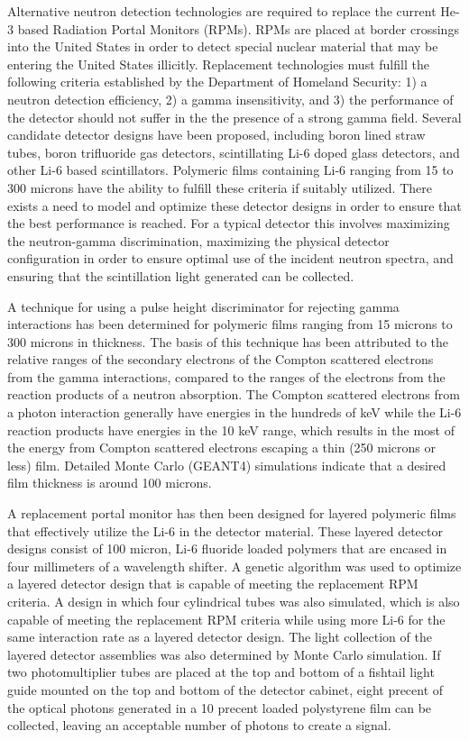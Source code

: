 Alternative neutron detection technologies are required to replace the current He-3 based Radiation Portal Monitors (RPMs).
RPMs are placed at border crossings into the United States in order to detect special nuclear material that may be entering the United States illicitly.
Replacement technologies must fulfill the following criteria established by the Department of Homeland Security: 1) a neutron detection efficiency, 2) a gamma insensitivity, and 3) the performance of the detector should not suffer in the the presence of a strong gamma field.
Several candidate detector designs have been proposed, including boron lined straw tubes, boron trifluoride gas detectors, scintillating Li-6 doped glass detectors, and other Li-6 based scintillators.
Polymeric films containing Li-6 ranging from 15 to 300 microns have the ability to fulfill these criteria if suitably utilized.
There exists a need to model and optimize these detector designs in order to ensure that the best performance is reached. 
For a typical detector this involves maximizing the neutron-gamma discrimination, maximizing the physical detector configuration in order to ensure optimal use of the incident neutron spectra, and ensuring that the scintillation light generated can be collected.

A technique for using a pulse height discriminator for rejecting gamma interactions has been determined for polymeric films  ranging from 15 microns to 300 microns in thickness.
The basis of this technique has been attributed to the relative ranges of the secondary electrons of the Compton scattered electrons from the gamma interactions, compared to the ranges of the electrons from the reaction products of a neutron absorption.
The Compton scattered electrons from a photon interaction generally have energies in the hundreds of keV while the Li-6 reaction products have energies in the 10 keV range, which results in the most of the energy from Compton scattered electrons escaping a thin (250 microns or less) film.
Detailed Monte Carlo (GEANT4) simulations indicate that a desired film thickness is around 100 microns.

A replacement portal monitor has then been designed for layered polymeric films that effectively utilize the Li-6 in the detector material.
These layered detector designs consist of 100 micron, Li-6 fluoride loaded polymers that are encased in four millimeters of a wavelength shifter.
A genetic algorithm was used to optimize a layered detector design that is capable of meeting the replacement RPM criteria.
A design in which four cylindrical tubes was also simulated, which is also capable of meeting the replacement RPM criteria while using more Li-6 for the same interaction rate as a layered detector design.
The light collection of the layered detector assemblies was also determined by Monte Carlo simulation.
If two photomultiplier tubes are placed at the top and bottom of a fishtail light guide mounted on the top and bottom of the detector cabinet, eight precent of the optical photons generated in a 10 precent loaded polystyrene film can be collected, leaving an acceptable number of photons to create a signal.
